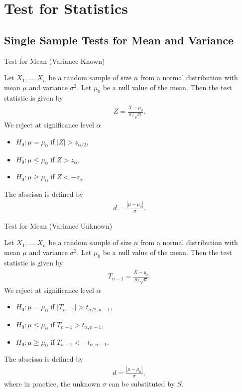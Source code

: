 \section{Test for Statistics}

\subsection{Single Sample Tests for Mean and Variance}

\begin{frame}{Test for Mean (Variance Known)}

\justifying
{} Let $X_1, \ldots, X_n$ be a random sample of size $n$ from a normal distribution with  mean $\mu$ and  variance $\sigma^2$. Let $\mu_0$ be a null value of the mean. Then the test statistic is given by
\begin{align*}
Z = \frac{\overline{X} - \mu_0}{\sigma/\sqrt{n}}.
\end{align*}
We reject at significance level $\alpha$
\begin{itemize}
	\item $H_0: \mu = \mu_0$ if $|Z| > z_{\alpha/2}$,
	\item $H_0: \mu\leq \mu_0$ if $Z > z_{\alpha}$,
	\item $H_0: \mu\geq \mu_0$ if $Z < -z_{\alpha}$.
\end{itemize}
 The abscissa is defined by
\begin{align*}
d = \frac{|\mu - \mu_0|}{\sigma}.
\end{align*}

\end{frame}


\begin{frame}{Test for Mean (Variance Unknown)}

\justifying
{} Let $X_1, \ldots, X_n$ be a random sample of size $n$ from a normal distribution with  mean $\mu$ and  variance $\sigma^2$. Let $\mu_0$ be a null value of the mean. Then the test statistic is given by
\begin{align*}
T_{n-1} = \frac{\overline{X} - \mu_0}{S/\sqrt{n}}.
\end{align*}
We reject at significance level $\alpha$
\begin{itemize}
	\item $H_0: \mu = \mu_0$ if $|T_{n-1}| > t_{\alpha/2, n-1}$,
	\item $H_0: \mu\leq \mu_0$ if $T_{n-1} > t_{\alpha, n-1}$,
	\item $H_0: \mu\geq \mu_0$ if $T_{n-1} < -t_{\alpha, n-1}$.
\end{itemize}
 The abscissa is defined by
\begin{align*}
d = \frac{|\mu - \mu_0|}{\sigma},
\end{align*}
where in practice, the unknown $\sigma$ can be substituted by $S$.

\end{frame}


